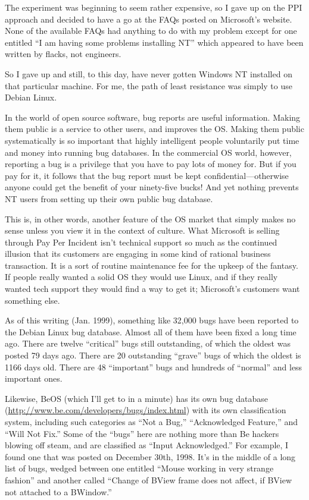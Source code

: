 \documentclass[
  fontsize=11pt,
  paper=landscape,
  twocolumn=true,
  pagesize=pdftex,
  headings=small,
  DIV=15,
  ]{scrartcl}
\begin{document}
The experiment was beginning to seem rather expensive, so I gave up on
the PPI approach and decided to have a go at the FAQs posted on
Microsoft's website. None of the available FAQs had anything to do with
my problem except for one entitled ``I am having some problems
installing NT'' which appeared to have been written by flacks, not
engineers.

So I gave up and still, to this day, have never gotten Windows NT
installed on that particular machine. For me, the path of least
resistance was simply to use Debian Linux.

In the world of open source software, bug reports are useful
information. Making them public is a service to other users, and
improves the OS. Making them public systematically is so important that
highly intelligent people voluntarily put time and money into running
bug databases. In the commercial OS world, however, reporting a bug is a
privilege that you have to pay lots of money for. But if you pay for it,
it follows that the bug report must be kept confidential---otherwise
anyone could get the benefit of your ninety-five bucks! And yet nothing
prevents NT users from setting up their own public bug database.

This is, in other words, another feature of the OS market that simply
makes no sense unless you view it in the context of culture. What
Microsoft is selling through Pay Per Incident isn't technical support so
much as the continued illusion that its customers are engaging in some
kind of rational business transaction. It is a sort of routine
maintenance fee for the upkeep of the fantasy. If people really wanted a
solid OS they would use Linux, and if they really wanted tech support
they would find a way to get it; Microsoft's customers want something
else.

As of this writing (Jan. 1999), something like 32,000 bugs have been
reported to the Debian Linux bug database. Almost all of them have been
fixed a long time ago. There are twelve ``critical'' bugs still
outstanding, of which the oldest was posted 79 days ago. There are 20
outstanding ``grave'' bugs of which the oldest is 1166 days old. There
are 48 ``important'' bugs and hundreds of ``normal'' and less important
ones.

Likewise, BeOS (which I'll get to in a minute) has its own bug database
(\url{http://www.be.com/developers/bugs/index.html}) with its own
classification system, including such categories as ``Not a Bug,''
``Acknowledged Feature,'' and ``Will Not Fix.'' Some of the ``bugs''
here are nothing more than Be hackers blowing off steam, and are
classified as ``Input Acknowledged.'' For example, I found one that was
posted on December 30th, 1998. It's in the middle of a long list of
bugs, wedged between one entitled ``Mouse working in very strange
fashion'' and another called ``Change of BView frame does not affect, if
BView not attached to a BWindow.''
\end{document}
